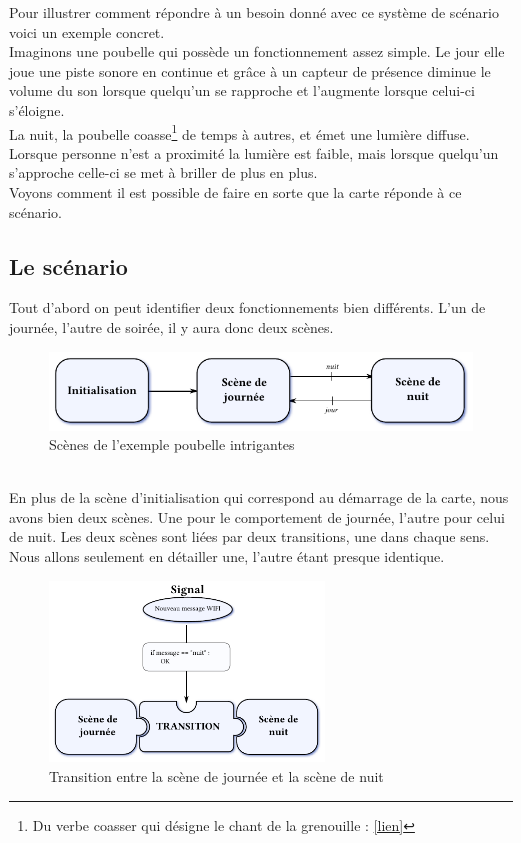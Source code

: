 Pour illustrer comment répondre à un besoin donné avec ce système de scénario voici un exemple concret.\\
Imaginons une poubelle qui possède un fonctionnement assez simple. Le jour elle joue une piste sonore en continue et grâce à un capteur de présence diminue le volume du son lorsque quelqu'un se rapproche et l'augmente lorsque celui-ci s'éloigne.\\
La nuit, la poubelle coasse\footnote{Du verbe coasser qui désigne le chant de la grenouille : \href{https://www.noslangues-ourlanguages.gc.ca/bien-well/fra-eng/vocabulaire-vocabulary/coasser-fra.html}{[lien]}} de temps à autres, et émet une lumière diffuse. Lorsque personne n'est a proximité la lumière est faible, mais lorsque quelqu'un s'approche celle-ci se met à briller de plus en plus.~\\
\indent Voyons comment il est possible de faire en sorte que la carte réponde à ce scénario.
\subsection{Le scénario}
Tout d'abord on peut identifier deux fonctionnements bien différents. L'un de journée, l'autre de soirée, il y aura donc deux scènes.\p
\begin{figure}[htbp]
  \centering
  \includegraphics[width=.90\textwidth]{figs/scenario_poubelle_scene.pdf}
  \caption{Scènes de l'exemple poubelle intrigantes}
  \label{fig:ex_poubelle_scene}
\end{figure} ~\\
En plus de la scène d'initialisation qui correspond au démarrage de la carte, nous avons bien deux scènes. Une pour le comportement de journée, l'autre pour celui de nuit. Les deux scènes sont liées par deux transitions, une dans chaque sens. Nous allons seulement en détailler une, l'autre étant presque identique.
\begin{figure}[htbp]
  \centering
  \includegraphics[width=0.65\textwidth]{figs/scenario_poubelle_scene_transition.pdf}
  \caption{Transition entre la scène de journée et la scène de nuit}
  \label{fig:ex_poubelle_scene_transition}
\end{figure} 

